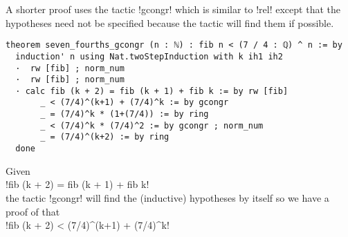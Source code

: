 
A shorter proof uses the tactic !gcongr! which is similar to !rel! except that the hypotheses need not be specified because the tactic will find them if possible.
\begin{Verbatim}
theorem seven_fourths_gcongr (n : ℕ) : fib n < (7 / 4 : ℚ) ^ n := by
  induction' n using Nat.twoStepInduction with k ih1 ih2
  ·  rw [fib] ; norm_num
  ·  rw [fib] ; norm_num
  · calc fib (k + 2) = fib (k + 1) + fib k := by rw [fib]
       _ < (7/4)^(k+1) + (7/4)^k := by gcongr
       _ = (7/4)^k * (1+(7/4)) := by ring
       _ < (7/4)^k * (7/4)^2 := by gcongr ; norm_num
       _ = (7/4)^(k+2) := by ring
  done
\end{Verbatim}

\newpage

Given\\
\indnt{}!fib (k + 2) = fib (k + 1) + fib k!\\
the tactic !gcongr! will find the (inductive) hypotheses by itself so we have a proof of that\\
\indnt{}!fib (k + 2) < (7/4)^(k+1) + (7/4)^k!

